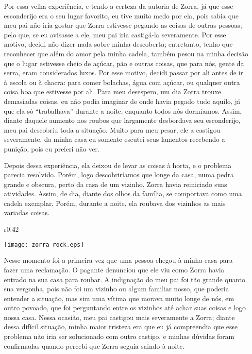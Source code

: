Por essa velha experiência, e tendo a certeza da autoria de Zorra, já que esse esconderijo era o seu lugar favorito, eu tive muito medo por ela, pois sabia que meu pai não iria gostar que Zorra estivesse pegando as coisas de outras pessoas; pelo que, se eu avisasse a ele, meu pai iria castigá-la severamente. Por esse motivo, decidi não dizer nada sobre minha descoberta; entretanto, tenho que reconhecer que além do amor pela minha cadela, também pesou na minha decisão que o lugar estivesse cheio de açúcar, pão e outras coisas, que para nós, gente da serra, eram considerados luxos. 
Por esse motivo, decidi passar por ali antes de ir à escola ou à chacra: para comer bolachas, água com açúcar, ou qualquer outra coisa boa que estivesse por ali. 
Para meu desespero, um dia Zorra trouxe demasiadas coisas, eu  não podia imaginar de onde havia pegado tudo aquilo, já que ela só ``trabalhava'' durante a noite, enquanto todos nós dormíamos. Assim, diante daquele aumento nos roubos que largamente desbordava seu esconderijo, meu pai descobriu toda a situação.
Muito para meu pesar, ele a castigou severamente, da minha casa eu somente escutei seus lamentos recebendo a punição, pois eu preferi não ver.


Depois dessa experiência, ela deixou de levar as coisas à horta, e o problema parecia resolvido. Porém, logo descobriríamos que longe da casa, numa pedra grande e obscura, perto da casa de um vizinho, 
Zorra havia reiniciado suas atividades. Assim, de dia, diante dos olhos da família, se comportava como uma cadela exemplar. Porém, durante a noite, ela roubava dos vizinhos as mais variadas coisas.

\ifdefined\EnableIncludeImages
\begin{wrapfigure}{r}{0.42\textwidth}
  \begin{center}
  \vspace{-10pt}
    \texttt{[image: zorra-rock.eps]}
  \end{center}
  \vspace{-20pt}
\end{wrapfigure}
\fi
Nesse momento foi a primeira vez que uma pessoa chegou à minha casa para fazer uma reclamação. O pagante denunciou que ele viu como Zorra havia entrado na sua casa para roubar. 
A indignação do meu pai foi tão grande quanto sua vergonha, pois não foi um vizinho ou algum familiar nosso, que poderia entender a situação, mas sim uma vítima que morava muito longe de nós, em outro povoado, que foi perguntando entre os vizinhos até achar suas coisas e logo nossa casa.
Nessa ocasião, meu pai castigou mais severamente a Zorra; diante dessa difícil situação, minha maior tristeza era que eu já compreendia que esse problema não iria ser solucionado com outro castigo, e minhas dúvidas foram confirmadas quando percebi que Zorra seguia saindo à noite. 

